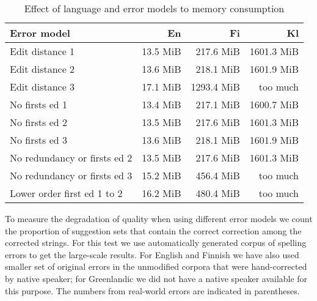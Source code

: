 \documentclass[11pt]{article}
\begin{document}
\begin{table}[h]
\begin{center}
\begin{scriptsize}
\begin{tabular}{|l|rrr|}
\hline
\bf Error model & \bf En & \bf Fi & \bf Kl \\ 
\hline
Edit distance 1 &
13.5 MiB&217.6 MiB&1601.3 MiB
\\
Edit distance 2 &
13.6 MiB&218.1 MiB&1601.9 MiB
\\
Edit distance 3 &
17.1 MiB&1293.4 MiB&too much
\\
No firsts ed 1 & 
13.4 MiB&217.1 MiB&1600.7 MiB
\\
No firsts ed 2 &
13.5 MiB&217.6 MiB&1601.3 MiB
\\
No firsts ed 3 &
13.6 MiB&218.1 MiB&1601.9 MiB
\\
No redundancy or firsts ed 2 &
13.5 MiB&217.6 MiB&1601.3 MiB
\\
No redundancy or firsts ed 3 &
15.2 MiB&456.4 MiB&too much
\\
Lower order first ed 1 to 2 &
16.2 MiB&480.4 MiB&too much
\\
\hline
\end{tabular}
\end{scriptsize}
\end{center}
\caption{\label{table:error-model-vs-language-memory} Effect of language and 
error models to memory consumption}
\end{table}

To measure the degradation of quality when using different error models we
count the proportion of suggestion sets that contain the correct correction
among the corrected strings. For this test we use automatically generated corpus
of spelling errors to get the large-scale results. For English and Finnish we
have also used smaller set of original errors in the unmodified corpora that
were hand-corrected by native speaker; for Greenlandic we did not have a native
speaker available for this purpose. The numbers from real-world errors are 
indicated in parentheses.
\end{document}
